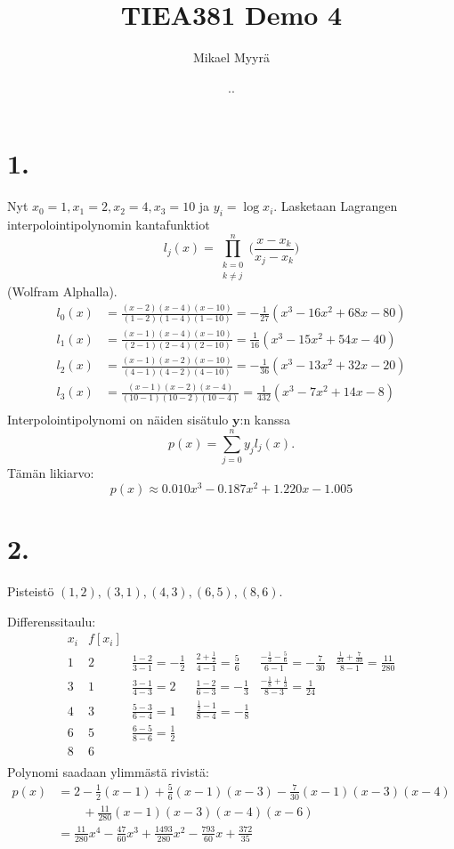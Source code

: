 \documentclass{article}
\title{TIEA381 Demo 4}
\author{Mikael Myyrä}
\date{\number\day.\number\month.\number\year}
\begin{document}
\maketitle

\section*{1.}

Nyt  $x_0 = 1, x_1 = 2, x_2 = 4, x_3 = 10$
ja $y_i = \log x_i$.
Lasketaan Lagrangen interpolointipolynomin kantafunktiot
\[
  l_j(x) = \prod_{\substack{k=0 \\ k \neq j}}^{n}
    \Big(\frac{x - x_k}{x_j - x_k}\Big)
\]
(Wolfram Alphalla).
\begin{align*}
  l_0(x) &= \frac{(x-2)(x-4)(x-10)}{(1-2)(1-4)(1-10)} = -\frac{1}{27}(x^3 - 16x^2 + 68x - 80) \\
  l_1(x) &= \frac{(x-1)(x-4)(x-10)}{(2-1)(2-4)(2-10)} = \frac{1}{16}(x^3 - 15x^2 + 54x - 40) \\
  l_2(x) &= \frac{(x-1)(x-2)(x-10)}{(4-1)(4-2)(4-10)} = -\frac{1}{36}(x^3 - 13x^2 + 32x - 20) \\
  l_3(x) &= \frac{(x-1)(x-2)(x-4)}{(10-1)(10-2)(10-4)} = \frac{1}{432}(x^3 - 7x^2 + 14x - 8) \\
\end{align*}
Interpolointipolynomi on näiden sisätulo $\mathbf{y}$:n kanssa
\[
  p(x) = \sum_{j=0}^{n} y_jl_j(x).
\]
Tämän likiarvo:
\[
  p(x) \approx 0.010x^3 - 0.187x^2 + 1.220x - 1.005
\]


\section*{2.}

Pisteistö $(1,2),(3,1),(4,3),(6,5),(8,6)$.

Differenssitaulu:
\[
  \begin{array}{c|ccccc}
    x_i & f[x_i] \\
    1 & 2 & \frac{1-2}{3-1} = -\frac{1}{2} & \frac{2+\frac{1}{2}}{4-1} = \frac{5}{6}
      & \frac{-\frac{1}{3}-\frac{5}{6}}{6-1} = -\frac{7}{30}
      & \frac{\frac{1}{24}+\frac{7}{30}}{8-1} = \frac{11}{280} \\
    3 & 1 & \frac{3-1}{4-3} = 2 & \frac{1-2}{6-3} = -\frac{1}{3} 
      & \frac{-\frac{1}{8}+\frac{1}{3}}{8-3} = \frac{1}{24} \\
    4 & 3 & \frac{5-3}{6-4} = 1 & \frac{\frac{1}{2}-1}{8-4} = -\frac{1}{8} \\
    6 & 5 & \frac{6-5}{8-6} = \frac{1}{2} \\
    8 & 6 \\
  \end{array}
\]
Polynomi saadaan ylimmästä rivistä:
\begin{align*}
  p(x) &= 2 - \frac{1}{2}(x-1) + \frac{5}{6}(x-1)(x-3)
    - \frac{7}{30}(x-1)(x-3)(x-4) \\
       & \qquad + \frac{11}{280}(x-1)(x-3)(x-4)(x-6) \\
       &= \frac{11}{280}x^4 - \frac{47}{60}x^3 
       + \frac{1493}{280}x^2 - \frac{793}{60}x + \frac{372}{35} \\
\end{align*}
\end{document}
